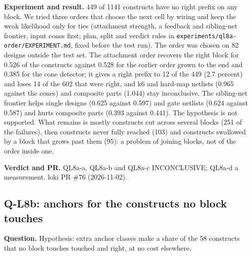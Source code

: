 \documentclass[conference]{IEEEtran}
\newcommand{\hev}[1]{\par\smallskip\noindent\textbf{#1}}
\newcommand{\code}[1]{\texttt{#1}}
\begin{document}
\hev{Experiment and result.} 449 of 1141 constructs have no right prefix on any block. We tried three orders that choose the
next cell by wiring and keep the weak likelihood only for ties (attachment strength, a feedback and sibling-net frontier, input cones first; plan, split and verdict rules in
\code{experiments/ql8a-order/EXPERIMENT.md}, fixed before the test run). The order was chosen on 82 designs outside the test set. The attachment order recovers the right block for
0.526 of the constructs against 0.528 for the earlier order grown to the end and 0.385 for the cone detector; it gives a right prefix to 12 of the 449 (2.7 percent) and loses 14
of the 602 that were right, and k6 and hard-map netlists (0.965 against the cones) and composite parts (1.044) stay inconclusive. The sibling-net frontier helps single designs
(0.625 against 0.597) and gate netlists (0.624 against 0.587) and hurts composite parts (0.393 against 0.441). The hypothesis is not supported. What remains is mostly constructs cut across
several blocks (251 of the failures), then constructs never fully reached (103) and constructs swallowed by a block that grows past them (95): a problem of joining blocks, not of the order
inside one.

\hev{Verdict and PR.} QL8a-a, QL8a-b and QL8a-c INCONCLUSIVE; QL8a-d a measurement. loki PR \#76 (2026-11-02).

\subsection{Q-L8b: anchors for the constructs no block touches}
\label{rec:ql8b}

\hev{Question.} Hypothesis: extra anchor classes make a share of the 58 constructs that no block touches touched and right, at no cost elsewhere.
\end{document}
